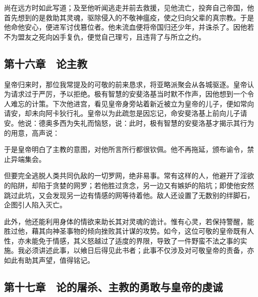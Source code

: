 尚在远方时如此写道；及至他听闻逃走并前去救援，见他流亡，投奔自己帝国，他首先想到的是救助其灵魂，驱除侵入的不敬神瘟疫，使之归向父辈的真宗教。于是他命他安心，便进军讨伐篡位者。他未流血便将帝国归还少年，并诛杀了。因他若不为盟友之死向凶手复仇，便觉自己理亏，且违背了与所立之约。\par


\subsection{第十六章　论主教}

皇帝归来时，那位我常提及的可敬的前来恳求，将亚略派聚会从各城驱逐。皇帝认为请求过于严厉，予以拒绝。极有智慧的安斐洛基当时默不作声，因他想到一个令人难忘的计策。下次他进宫，看见皇帝身旁站着新近被立为皇帝的儿子，便如常向请安，却未向阿卡狄行礼。皇帝以为此疏忽是因忘记，命安斐洛基上前向儿子请安。他说：德奥多西为失礼而恼怒，说：此时，极有智慧的安斐洛基才揭示其行为的用意，高声说：\par

于是皇帝明白了主教的意图，对他所言所行都很钦佩。他不再拖延，颁布谕令，禁止异端集会。\par

但要完全逃脱人类共同仇敌的一切罗网，绝非易事。常有这样的人，他避开了淫欲的陷阱，却陷于贪婪的网罗；若他胜过贪念，另一边又有嫉妒的陷坑；即使他安然跳过此坑，又会发现另一边有情感的网等待着他。敌人还设置了无数别的绊脚石，企图引人陷入灭亡。\par

此外，他还能利用身体的情欲来助长其对灵魂的诡计。惟有心灵，若保持警醒，能胜过他，藉其向神圣事物的倾向挫败其计谋的攻势。如今，这位可敬的皇帝既有人性，亦未能免于情感，其义怒越过了适度的界限，导致了一件野蛮不法之事的实施。我必须讲述此事，以飨日后得见此书者；此事不仅涉及对可敬皇帝的责备，亦如此有助其声望，值得铭记。\par


\subsection{第十七章　论的屠杀、主教的勇敢与皇帝的虔诚}

